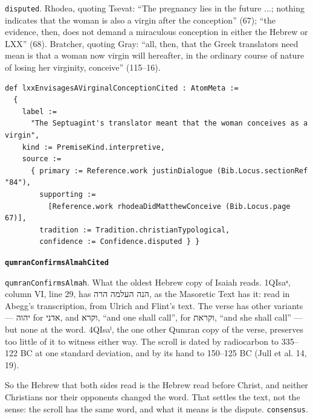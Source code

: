 \documentclass[11pt]{article}
\begin{document}
\texttt{disputed}. Rhodea, quoting Tsevat: “The pregnancy lies in the future ...; nothing indicates that the woman is also a virgin after the conception” (67); “the evidence, then, does not demand a miraculous conception in either the Hebrew or LXX” (68). Bratcher, quoting Gray: “all, then, that the Greek translators need mean is that a woman now virgin will hereafter, in the ordinary course of nature of losing her virginity, conceive” (115–16).

{\small\begin{verbatim}
def lxxEnvisagesAVirginalConceptionCited : AtomMeta :=
  {
    label :=
      "The Septuagint's translator meant that the woman conceives as a virgin",
    kind := PremiseKind.interpretive,
    source :=
      { primary := Reference.work justinDialogue (Bib.Locus.sectionRef "84"),
        supporting :=
          [Reference.work rhodeaDidMatthewConceive (Bib.Locus.page 67)],
        tradition := Tradition.christianTypological,
        confidence := Confidence.disputed } }
\end{verbatim}}
\par\medskip\noindent\textbf{\texttt{qumran\allowbreak{}Confirms\allowbreak{}Almah\allowbreak{}Cited}}\par\nobreak\noindent
\texttt{qumran\allowbreak{}Confirms\allowbreak{}Almah}. What the oldest Hebrew copy of Isaiah reads. 1QIsaᵃ, column VI, line 29, has הנה העלמה הרה, as the Masoretic Text has it: read in Abegg’s transcription, from Ulrich and Flint’s text. The verse has other variants — יהוה for אדני, and וקרא, “and one shall call”, for וקראת, “and she shall call” — but none at the word. 4QIsaˡ, the one other Qumran copy of the verse, preserves too little of it to witness either way. The scroll is dated by radiocarbon to 335–122 BC at one standard deviation, and by its hand to 150–125 BC (Jull et al. 14, 19).

So the Hebrew that both sides read is the Hebrew read before Christ, and neither Christians nor their opponents changed the word. That settles the text, not the sense: the scroll has the same word, and what it means is the dispute. \texttt{consensus}.
\end{document}
